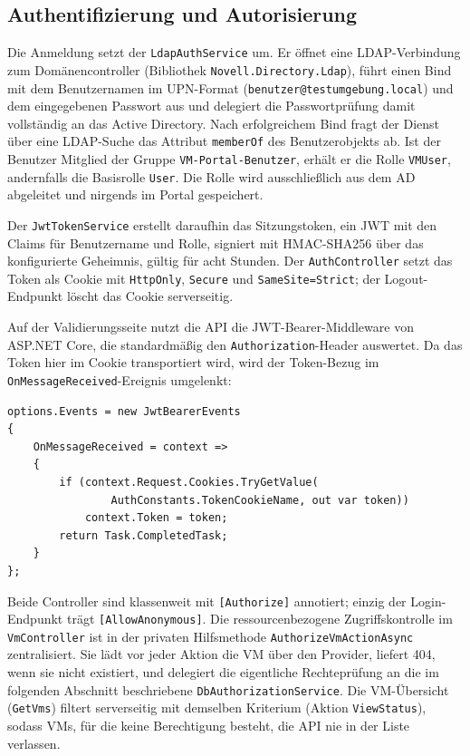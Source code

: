 \documentclass[12pt,a4paper]{article}
\begin{document}
\subsection{Authentifizierung und Autorisierung}
\label{sec:impl-auth}

Die Anmeldung setzt der \texttt{LdapAuthService} um. Er öffnet eine LDAP-Verbindung zum Domänencontroller (Bibliothek \texttt{Novell.Directory.Ldap}), führt einen Bind mit dem Benutzernamen im UPN-Format (\texttt{benutzer@testumgebung.local}) und dem eingegebenen Passwort aus und delegiert die Passwortprüfung damit vollständig an das Active Directory. Nach erfolgreichem Bind fragt der Dienst über eine LDAP-Suche das Attribut \texttt{memberOf} des Benutzerobjekts ab. Ist der Benutzer Mitglied der Gruppe \texttt{VM-Portal-Benutzer}, erhält er die Rolle \texttt{VMUser}, andernfalls die Basisrolle \texttt{User}. Die Rolle wird ausschließlich aus dem AD abgeleitet und nirgends im Portal gespeichert.

Der \texttt{JwtTokenService} erstellt daraufhin das Sitzungstoken, ein JWT mit den Claims für Benutzername und Rolle, signiert mit HMAC-SHA256 über das konfigurierte Geheimnis, gültig für acht Stunden. Der \texttt{AuthController} setzt das Token als Cookie mit \texttt{HttpOnly}, \texttt{Secure} und \texttt{SameSite=Strict}; der Logout-Endpunkt löscht das Cookie serverseitig.

Auf der Validierungsseite nutzt die API die JWT-Bearer-Middleware von ASP.NET Core, die standardmäßig den \texttt{Authorization}-Header auswertet. Da das Token hier im Cookie transportiert wird, wird der Token-Bezug im \texttt{OnMessageReceived}-Ereignis umgelenkt:

\begin{lstlisting}[language={[Sharp]C}, caption={Token-Bezug aus dem httpOnly-Cookie statt aus dem Authorization-Header (\texttt{Program.cs})}, label={lst:cookieauth}]
options.Events = new JwtBearerEvents
{
    OnMessageReceived = context =>
    {
        if (context.Request.Cookies.TryGetValue(
                AuthConstants.TokenCookieName, out var token))
            context.Token = token;
        return Task.CompletedTask;
    }
};
\end{lstlisting}

Beide Controller sind klassenweit mit \texttt{[Authorize]} annotiert; einzig der Login-Endpunkt trägt \texttt{[AllowAnonymous]}. Die ressourcenbezogene Zugriffskontrolle im \texttt{VmController} ist in der privaten Hilfsmethode \texttt{AuthorizeVmActionAsync} zentralisiert. Sie lädt vor jeder Aktion die VM über den Provider, liefert 404, wenn sie nicht existiert, und delegiert die eigentliche Rechteprüfung an die im folgenden Abschnitt beschriebene \texttt{DbAuthorizationService}. Die VM-Übersicht (\texttt{GetVms}) filtert serverseitig mit demselben Kriterium (Aktion \texttt{ViewStatus}), sodass VMs, für die keine Berechtigung besteht, die API nie in der Liste verlassen.
\end{document}

